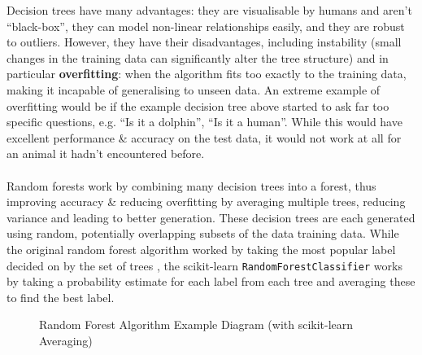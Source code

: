 \documentclass[a4paper]{article}
\begin{document}
Decision trees have many advantages: they are visualisable by humans and aren't ``black-box'', they can model non-linear relationships easily, and they are robust to outliers.
However, they have their disadvantages, including instability (small changes in the training data can significantly alter the tree structure) and in particular \textbf{overfitting}: when the algorithm fits too exactly to the training data, making it incapable of generalising to unseen data.
An extreme example of overfitting would be if the example decision tree above started to ask far too specific questions, e.g. ``Is it a dolphin'', ``Is it a human''. 
While this would have excellent performance \& accuracy on the test data, it would not work at all for an animal it hadn't encountered before.
\\\\
Random forests work by combining many decision trees into a forest, thus improving accuracy \& reducing overfitting by averaging multiple trees, reducing variance and leading to better generation.
These decision trees are each generated using random, potentially overlapping subsets of the data training data.
While the original random forest algorithm worked by taking the most popular label decided on by the set of trees \supercite{breiman}, the scikit-learn \texttt{RandomForestClassifier} works by taking a probability estimate for each label from each tree and averaging these to find the best label\supercite{scikit_ensembles}.

\begin{figure}[H]
    \centering
{}
\caption{Random Forest Algorithm Example Diagram (with scikit-learn Averaging)}
\end{figure}
\end{document}
